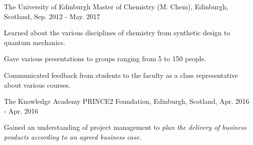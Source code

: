 \begin{cventries}
  \cventry
    {The University of Edinburgh} %
    {Master of Chemistry (M. Chem), } %
    {Edinburgh, Scotland, } %
    {Sep. 2012 - May. 2017} %
    {
      \begin{cvitems} %
        \item{Learned about the various disciplines of chemistry from synthetic design to quantum mechanics.}
        \item {Gave various presentations to groups ranging from 5 to 150 people.}
        \item{Communicated feedback from students to the faculty as a class representative about various courses. }
      \end{cvitems}
    }


    \cventry
    {The Knowledge Academy} %
    {PRINCE2 Foundation, } %
    {Edinburgh, Scotland, } %
    {Apr. 2016 - Apr. 2016} %
    {
      \begin{cvitems} %
        \item {Gained an understanding of project management to \textit{plan the delivery of business products according to an agreed business case.}}
      \end{cvitems}
    }

\end{cventries}
